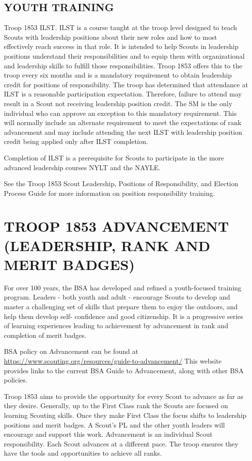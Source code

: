 \documentclass{ltxguide}
\begin{document}
\subsection{YOUTH TRAINING}
Troop 1853 \ac{ILST}. \ac{ILST} is a course taught at the troop level designed to teach Scouts with leadership positions about their new roles and how to most effectively reach success in that role. It is intended to help Scouts in leadership positions understand their responsibilities and to equip them with organizational and leadership skills to fulfill those responsibilities. Troop 1853 offers this to the troop every six months and is a mandatory requirement to obtain leadership credit for positions of responsibility. The troop has determined that attendance at ILST is a reasonable participation expectation. Therefore, failure to attend may result in a Scout not receiving leadership position credit. The \ac{SM} is the only individual who can approve an exception to this mandatory requirement. This will normally include an alternate requirement to meet the expectations of rank advancement and may include attending the next ILST with leadership position credit being applied only after ILST completion.

Completion of ILST is a prerequisite for Scouts to participate in the more advanced leadership courses \ac{NYLT} and the \ac{NAYLE}.

See the Troop 1853 Scout Leadership, Positions of Responsibility, and Election Process Guide for more information on position responsibility training.


\section{TROOP 1853 ADVANCEMENT (LEADERSHIP, RANK AND MERIT BADGES)}
For over 100 years, the \ac{BSA} has developed and refined a youth-focused training program. Leaders - both youth and adult - encourage Scouts to develop and master a challenging set of skills that prepare them to enjoy the outdoors, and help them develop self- confidence and good citizenship. It is a progressive series of learning experiences leading to achievement by advancement in rank and completion of merit badges.

\ac{BSA} policy on Advancement can be found at \url{https://www.scouting.org/resources/guide-to-advancement/} This website provides links to the current \ac{BSA} Guide to Advancement, along with other \ac{BSA} policies.

Troop 1853 aims to provide the opportunity for every Scout to advance as far as they desire. Generally, up to the First Class rank the Scouts are focused on learning Scouting skills. Once they make First Class the focus shifts to leadership positions and merit badges. A Scout's \ac{PL} and the other youth leaders will encourage and support this work. Advancement is an individual Scout responsibility. Each Scout advances at a different pace. The troop ensures they have the tools and opportunities to achieve all ranks.
\end{document}
